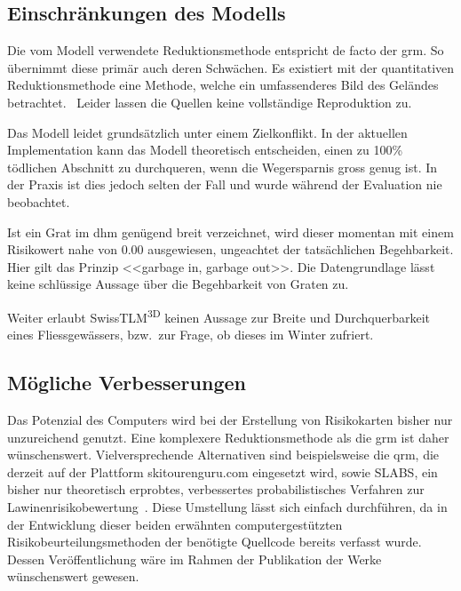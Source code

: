 \clearpage

\subsection{Einschränkungen des Modells}
Die vom Modell verwendete Reduktionsmethode entspricht de facto der \acrshort{grm}. So übernimmt diese primär auch deren Schwächen. Es existiert mit der quantitativen Reduktionsmethode eine Methode, welche ein umfassenderes Bild des Geländes betrachtet.~\cite{qrm}
Leider lassen die Quellen keine vollständige Reproduktion zu.

Das Modell leidet grundsätzlich unter einem Zielkonflikt. In der aktuellen Implementation kann das Modell theoretisch entscheiden, einen zu 100\% tödlichen Abschnitt zu durchqueren, wenn die Wegersparnis gross genug ist. In der Praxis ist dies jedoch selten der Fall und wurde während der Evaluation nie beobachtet.

Ist ein Grat im \acrshort{dhm} genügend breit verzeichnet, wird dieser momentan mit einem Risikowert nahe von $0.00$ ausgewiesen, ungeachtet der tatsächlichen Begehbarkeit. Hier gilt das Prinzip <<garbage in, garbage out>>. Die Datengrundlage lässt keine schlüssige Aussage über die Begehbarkeit von Graten zu.

Weiter erlaubt SwissTLM\textsuperscript{3D} keinen Aussage zur Breite und Durchquerbarkeit eines Fliessgewässers, bzw.\ zur Frage, ob dieses im Winter zufriert.

\subsection{Mögliche Verbesserungen}\label{sec:improvements}

Das Potenzial des Computers wird bei der Erstellung von Risikokarten bisher nur unzureichend genutzt. Eine komplexere Reduktionsmethode als die \acrshort{grm} ist daher wünschenswert. Vielversprechende Alternativen sind beispielsweise die \gls{qrm}, die derzeit auf der Plattform skitourenguru.com eingesetzt wird, sowie SLABS, ein bisher nur theoretisch erprobtes, verbessertes probabilistisches Verfahren zur Lawinenrisikobewertung~\cite{qrm}\cite{slabs}. Diese Umstellung lässt sich einfach durchführen, da in der Entwicklung dieser beiden erwähnten computergestützten Risikobeurteilungsmethoden der benötigte Quellcode bereits verfasst wurde. Dessen Veröffentlichung wäre im Rahmen der Publikation der Werke wünschenswert gewesen.

